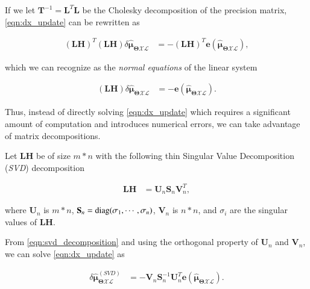 If we let $\mathbf{T}^{-1}=\mathbf{L}^T\mathbf{L}$ be the Cholesky
decomposition of the precision matrix, \eqref{eqn:dx_update} can be rewritten as

\begin{equation}\label{eqn:dx_update_normal}
  \begin{aligned}
  (\mathbf{L}\mathbf{H})^T(\mathbf{L}\mathbf{H})
    \delta\hat{\boldsymbol{\mu}}_{\boldsymbol{\Theta}\mathcal{X}\mathcal{L}} &= 
    -(\mathbf{L}\mathbf{H})^T\mathbf{e}(\mathbf{\hat{\boldsymbol{\mu}}_{
    \boldsymbol{\Theta}\mathcal{X}\mathcal{L}}}),
  \end{aligned}
\end{equation}

which we can recognize as the \emph{normal equations} of the linear system

\begin{equation}\label{eqn:dx_update_standard}
  \begin{aligned}
  (\mathbf{L}\mathbf{H})
    \delta\hat{\boldsymbol{\mu}}_{\boldsymbol{\Theta}\mathcal{X}\mathcal{L}} &=
    -\mathbf{e}(
    \mathbf{\hat{\boldsymbol{\mu}}_{
    \boldsymbol{\Theta}\mathcal{X}\mathcal{L}}}).
  \end{aligned}
\end{equation}

Thus, instead of directly solving \eqref{eqn:dx_update} which requires a
significant amount of computation and introduces numerical errors, we can take
advantage of matrix decompositions.

Let $\mathbf{L}\mathbf{H}$ be of size $m*n$ with the following thin
Singular Value Decomposition (\emph{SVD}) decomposition

\begin{equation}\label{eqn:svd_decomposition}
  \begin{aligned}
  \mathbf{L}\mathbf{H} &= \mathbf{U}_n\mathbf{S}_n\mathbf{V}_n^T,
  \end{aligned}
\end{equation}

where $\mathbf{U}_n$ is $m*n$, $\mathbf{S}_n=\operatorname{diag}(\sigma_1, \cdots, \sigma_n)$,
$\mathbf{V}_n$ is $n*n$, and $\sigma_i$ are the singular values of
$\mathbf{L}\mathbf{H}$.

From \eqref{eqn:svd_decomposition} and using the orthogonal property of
$\mathbf{U}_n$ and $\mathbf{V}_n$, we can solve \eqref{eqn:dx_update} as

\begin{equation}\label{eqn:dx_svd_solve}
  \begin{aligned}
  \delta\hat{\boldsymbol{\mu}}_{\boldsymbol{\Theta}\mathcal{X}\mathcal{L}}^
    {(SVD)} &=
    -\mathbf{V}_n\mathbf{S}_n^{-1}\mathbf{U}_n^T
    \mathbf{e}(
    \mathbf{\hat{\boldsymbol{\mu}}_{
    \boldsymbol{\Theta}\mathcal{X}\mathcal{L}}}).
  \end{aligned}
\end{equation}

